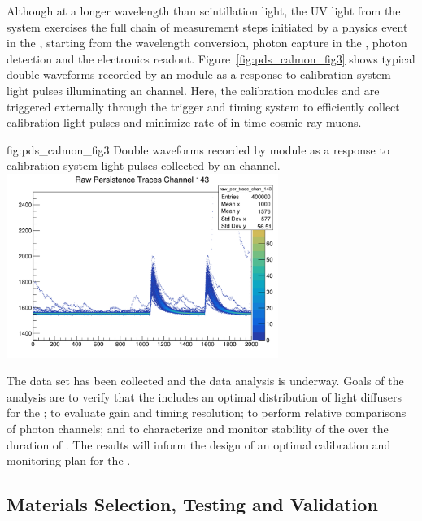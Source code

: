 Although at a longer wavelength than \lar scintillation light, the UV light from the system exercises the full chain of measurement steps initiated by a physics event in the , starting from the wavelength %
conversion, photon capture in the , photon %
detection and the  electronics readout.
Figure~\ref{fig:pds_calmon_fig3} shows typical double waveforms recorded by an   module as a response to calibration system
light pulses illuminating %
an  channel. Here, the calibration modules and  are triggered externally through the trigger and timing system to efficiently collect calibration light pulses  and minimize rate of in-time cosmic ray muons.

 \begin{dunefigure}
 {fig:pds_calmon_fig3}
 {Double waveforms recorded by   module as a response to calibration system light pulses collected by an  channel.}
\includegraphics[height=6cm]{graphics/pds-calmon-example.png}
\end{dunefigure}

The  data set has been collected and the data analysis is underway.
Goals of the analysis are to verify that the  includes %
an optimal distribution of light diffusers for the ;  %
to evaluate gain and timing resolution; to perform relative comparisons of photon channels;
and to characterize and monitor stability of the  over the duration of . The results will inform the design of an optimal
 calibration and monitoring plan for the .%


\subsection{Materials Selection, Testing and Validation}

